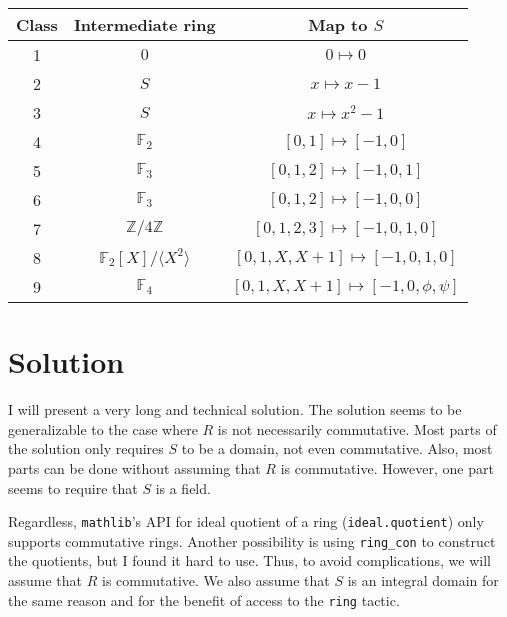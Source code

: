 \documentclass{article}
\newcommand{\F}{\mathbb{F}}
\newcommand{\Z}{\mathbb{Z}}
\begin{document}
\begin{table}[H]
\centering
\begin{tabular}{|c|c|c|}
    \hline
    Class & Intermediate ring & Map to $S$ \\ \hline
    1 & $0$ & $0 \mapsto 0$ \\ \hline
    2 & $S$ & $x \mapsto x - 1$ \\ \hline
    3 & $S$ & $x \mapsto x^2 - 1$ \\ \hline
    4 & $\F_2$ & $[0, 1] \mapsto [-1, 0]$ \\ \hline
    5 & $\F_3$ & $[0, 1, 2] \mapsto [-1, 0, 1]$ \\ \hline
    6 & $\F_3$ & $[0, 1, 2] \mapsto [-1, 0, 0]$ \\ \hline
    7 & $\Z/4\Z$ & $[0, 1, 2, 3] \mapsto [-1, 0, 1, 0]$ \\ \hline
    8 & $\F_2[X]/\langle X^2 \rangle$ & $[0, 1, X, X + 1] \mapsto [-1, 0, 1, 0]$ \\ \hline
    9 & $\F_4$ & $[0, 1, X, X + 1] \mapsto [-1, 0, \phi, \psi]$ \\ \hline
\end{tabular}
\end{table}









\section*{Solution}

I will present a very long and technical solution.
The solution seems to be generalizable to the case where $R$ is not necessarily commutative.
Most parts of the solution only requires $S$ to be a domain, not even commutative.
Also, most parts can be done without assuming that $R$ is commutative.
However, one part seems to require that $S$ is a field.

Regardless, \texttt{mathlib}'s API for ideal quotient of a ring (\texttt{ideal.quotient}) only supports commutative rings.
Another possibility is using \texttt{ring\_con} to construct the quotients, but I found it hard to use.
Thus, to avoid complications, we will assume that $R$ is commutative.
We also assume that $S$ is an integral domain for the same reason and for the benefit of access to the \texttt{ring} tactic.
\end{document}
